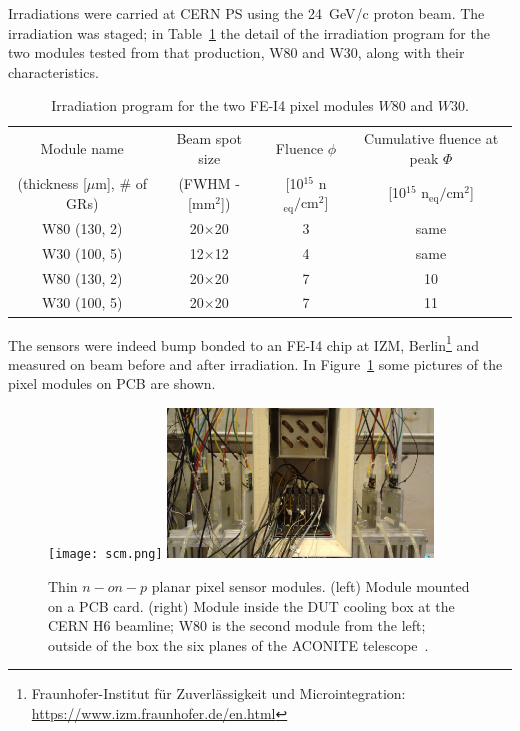 Irradiations were carried at CERN PS using the 24~GeV/c proton beam. The irradiation was staged; 
in Table~\ref{tab:W30W80Irr} the detail of the irradiation program for the two modules tested from 
that production, W80 and W30, along with their characteristics.  
\begin{table}[!htpb]
\caption{\label{tab:W30W80Irr}Irradiation program for the two FE-I4 pixel modules $W80$ and $W30$.}
\centering
\begin{tabular}{cccc}
\hline
Module name & Beam spot size & Fluence $\phi$& Cumulative fluence at  peak $\Phi$\\ 
(thickness [$\mu$m], \# of GRs) & (FWHM - [mm$^2$]) &  [10$^{15}$ n$_\text{eq}/\text{cm}^2$]  &  [10$^{15}$ n$_\text{eq}/\text{cm}^2$] \\
\hline
\hline 
W80 (130, 2) & 20$\times$20 & 3 & same\\
\hline
W30 (100, 5) & 12$\times$12 & 4 & same\\
\hline
W80 (130, 2) & 20$\times$20 & 7 & 10 \\
\hline
W30 (100, 5) & 20$\times$20 & 7 & 11\\
\hline
\end{tabular}
\end{table}

The sensors were indeed bump bonded to an FE-I4 chip at IZM, 
Berlin\footnote{Fraunhofer-Institut f\"ur Zuverl\"assigkeit und Microintegration: \url{https://www.izm.fraunhofer.de/en.html}} and measured 
on beam before and after irradiation. In Figure~\ref{fig:W80W30} some pictures of the pixel modules on 
PCB are shown. 
\begin{figure}[!htpb]
\centering
\texttt{[image: scm.png]}
\includegraphics[width=0.63\textwidth]{in_the_box.jpeg}
\caption{\label{fig:W80W30}Thin $n-on-p$ planar pixel sensor modules. (left) Module mounted 
on a PCB card. (right) Module inside 
the DUT cooling box at the CERN H6 beamline; W80 is the second module from the left; outside 
of the box the six planes of the ACONITE telescope~\cite{Jansen2016}.}
\end{figure}

